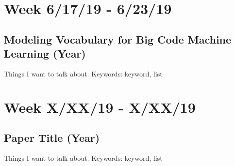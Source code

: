 \documentclass{article}
\begin{document}
\section*{Week 6/17/19 - 6/23/19}
\subsection*{Modeling Vocabulary for Big Code Machine Learning (Year)\cite{miller2019adversarial}}

Things I want to talk about.
\newline\newline
Keywords: keyword, list



\section*{Week X/XX/19 - X/XX/19}
\subsection*{Paper Title (Year)\cite{miller2019adversarial}}

Things I want to talk about.
\newline\newline
Keywords: keyword, list




\end{document}
